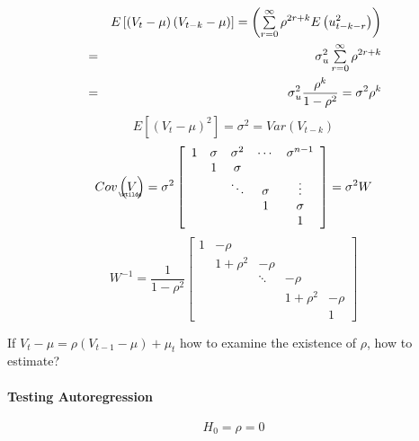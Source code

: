 \documentclass{article}
\begin{document}
\begin{eqnarray*}
&\therefore &E\left[ \left( V_{t}-\mu \right) \left( V_{t-k}-\mu \right) %
\right] =\left( \tsum\limits_{r=0}^{\infty }\rho ^{2r+k}E\left(
u_{t-k-r}^{2}\right) \right)  \\
&=&\sigma _{u}^{2}\tsum\limits_{r=0}^{\infty }\rho ^{2r+k} \\
&=&\sigma _{u}^{2}\frac{\rho ^{k}}{1-\rho ^{2}}=\sigma ^{2}\rho ^{k}
\end{eqnarray*}%
\begin{equation*}
E\left[ \left( V_{t}-\mu \right) ^{2}\right] =\sigma ^{2}=Var\left(
V_{t-k}\right) 
\end{equation*}%
\begin{equation*}
Cov\left( 
\underaccent{\wtilde}{V}%
\right) =\sigma ^{2}\left[ 
\begin{array}{ccccc}
1 & \sigma  & \sigma ^{2} & \cdots  & \sigma ^{n-1} \\ 
& 1 & \sigma  &  &  \\ 
&  & \ddots  & \sigma  & \vdots  \\ 
&  &  & 1 & \sigma  \\ 
&  &  &  & 1%
\end{array}%
\right] =\sigma ^{2}W
\end{equation*}%
\begin{equation*}
W^{-1}=\frac{1}{1-\rho ^{2}}\left[ 
\begin{array}{ccccc}
1 & -\rho  &  &  &  \\ 
& 1+\rho ^{2} & -\rho  &  &  \\ 
&  & \ddots  & -\rho  &  \\ 
&  &  & 1+\rho ^{2} & -\rho  \\ 
&  &  &  & 1%
\end{array}%
\right] 
\end{equation*}

If $V_{t}-\mu =\rho \left( V_{t-1}-\mu \right) +\mu _{t}$ how to examine the
existence of $\rho $, how to estimate?

\bigskip 

\paragraph{Testing Autoregression}

\begin{equation*}
H_{0}=\rho =0
\end{equation*}
\end{document}
